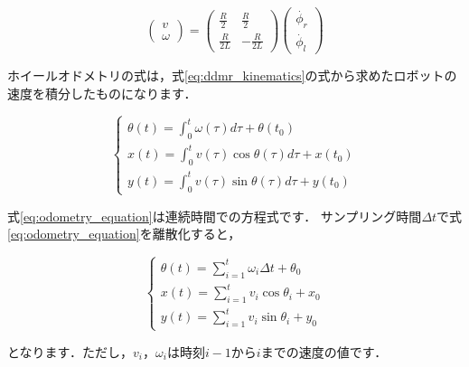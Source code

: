 \documentclass[{../../master}]{subfiles}
\begin{document}
\begin{equation}
  \begin{pmatrix}
    v \\
    \omega
  \end{pmatrix}
  =
  \begin{pmatrix}
    \frac{R}{2} & \frac{R}{2} \\
    \frac{R}{2L} & -\frac{R}{2L}
  \end{pmatrix}
  \begin{pmatrix}
    \dot{\phi_{r}} \\
    \dot{\phi_{l}}
  \end{pmatrix}
  \label{eq:ddmr_kinematics_in_matrix}
\end{equation}

ホイールオドメトリの式は，式\ref{eq:ddmr_kinematics}の式から求めたロボットの速度を積分したものになります．

\begin{equation}
  \begin{cases}
    \theta (t) = \int_0^t \omega(\tau)d\tau + \theta (t_0) \\
    x(t) = \int_0^t v(\tau)\cos{\theta (\tau)}d\tau + x(t_0) \\
    y(t) = \int_0^t v(\tau)\sin{\theta (\tau)}d\tau + y(t_0)
  \end{cases}
  \label{eq:odometry_equation}
\end{equation}

\noindent
式\ref{eq:odometry_equation}は連続時間での方程式です．
サンプリング時間$\Delta{t}$で式\ref{eq:odometry_equation}を離散化すると，

\begin{equation}
  \begin{cases}
    \theta (t) = \sum_{i=1}^t \omega_{i}\Delta{t} + \theta_{0} \\
    x(t) = \sum_{i=1}^t v_{i}\cos{\theta_{i}} + x_{0} \\
    y(t) = \sum_{i=1}^t v_{i}\sin{\theta_{i}} + y_{0}
  \end{cases}
\end{equation}

\noindent
となります．ただし，$v_{i}$，$\omega_{i}$は時刻$i-1$から$i$までの速度の値です．
\end{document}
